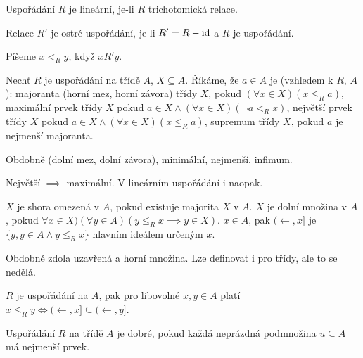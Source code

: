 \documentclass[12pt]{article}                   %
\begin{document}
    \begin{definice}
        Uspořádání $R$ je lineární, je-li $R$ trichotomická relace.
    \end{definice}

    \begin{definice}
        Relace $R'$ je ostré uspořádání, je-li $R' = R - \operatorname{id}$ a $R$ je uspořádání.

        Píšeme $x <_R y$, když $xR'y$.
    \end{definice}

    \begin{definice}
        Nechť $R$ je uspořádání na třídě $A$, $X \subseteq A$. Říkáme, že $a \in A$ je (vzhledem k $R$, $A$): majoranta (horní mez, horní závora) třídy $X$, pokud $(\forall x \in X)(x ≤_R a)$, maximální prvek třídy $X$ pokud $a \in X \land (\forall x \in X)(\neg a <_R x)$, největší prvek třídy $X$ pokud $a \in X \land (\forall x \in X)(x ≤_R a)$, supremum třídy $X$, pokud $a$ je nejmenší majoranta.

        Obdobně (dolní mez, dolní závora), minimální, nejmenší, infimum.
    \end{definice}

    \begin{pozorovani}
        Největší $\implies$ maximální. V lineárním uspořádání i naopak.
    \end{pozorovani}

    \begin{definice}
        $X$ je shora omezená v $A$, pokud existuje majorita $X$ v $A$. $X$ je dolní množina v $A$, pokud $\forall x \in X)(\forall y \in A)(y ≤_Rx \implies y \in X)$. $x \in A$, pak $(\leftarrow, x]$ je $\{y, y \in A \land y ≤_R x\}$ hlavním ideálem určeným $x$.

        Obdobně zdola uzavřená a horní množina. Lze definovat i pro třídy, ale to se nedělá.
    \end{definice}

    \begin{pozorovani}
        $R$ je uspořádání na $A$, pak pro libovolné $x, y \in A$ platí $x ≤_R y \Leftrightarrow (\leftarrow, x]\subseteq(\leftarrow, y]$.
    \end{pozorovani}

    \begin{definice}
        Uspořádání $R$ na třídě $A$ je dobré, pokud každá neprázdná podmnožina $u \subseteq A$ má nejmenší prvek.
    \end{definice}
\end{document}
